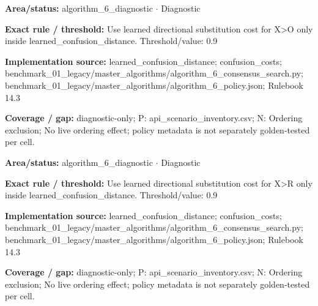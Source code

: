 \begin{tcolorbox}[enhanced,breakable,colback=white,colframe=Muted!45,boxrule=0.45pt,arc=1.5pt,left=6pt,right=6pt,top=5pt,bottom=5pt,title={\texttt{A6-LEARNED-SUBSTITUTION-X-O}},title after break={\texttt{A6-LEARNED-SUBSTITUTION-X-O}\ (continued)},fonttitle=\headingfont\bfseries\color{Navy},coltitle=Navy]
\textbf{Area/status:} algorithm\_\allowbreak{}6\_\allowbreak{}diagnostic $\boldsymbol{\cdot}$ Diagnostic\par
\smallskip
\textbf{Exact rule / threshold:} Use learned directional substitution cost for X>O only inside learned\_\allowbreak{}confusion\_\allowbreak{}distance. Threshold/\allowbreak{}value: 0.9\par
\smallskip
\textbf{Implementation source:} learned\_\allowbreak{}confusion\_\allowbreak{}distance; confusion\_\allowbreak{}costs; benchmark\_\allowbreak{}01\_\allowbreak{}legacy/\allowbreak{}master\_\allowbreak{}algorithms/\allowbreak{}algorithm\_\allowbreak{}6\_\allowbreak{}consensus\_\allowbreak{}search.py; benchmark\_\allowbreak{}01\_\allowbreak{}legacy/\allowbreak{}master\_\allowbreak{}algorithms/\allowbreak{}algorithm\_\allowbreak{}6\_\allowbreak{}policy.json; Rulebook 14.3\par
\smallskip
\textbf{Coverage / gap:} diagnostic-only; P: api\_\allowbreak{}scenario\_\allowbreak{}inventory.csv; N: Ordering exclusion; No live ordering effect; policy metadata is not separately golden-tested per cell.
\end{tcolorbox}
\begin{tcolorbox}[enhanced,breakable,colback=white,colframe=Muted!45,boxrule=0.45pt,arc=1.5pt,left=6pt,right=6pt,top=5pt,bottom=5pt,title={\texttt{A6-LEARNED-SUBSTITUTION-X-R}},title after break={\texttt{A6-LEARNED-SUBSTITUTION-X-R}\ (continued)},fonttitle=\headingfont\bfseries\color{Navy},coltitle=Navy]
\textbf{Area/status:} algorithm\_\allowbreak{}6\_\allowbreak{}diagnostic $\boldsymbol{\cdot}$ Diagnostic\par
\smallskip
\textbf{Exact rule / threshold:} Use learned directional substitution cost for X>R only inside learned\_\allowbreak{}confusion\_\allowbreak{}distance. Threshold/\allowbreak{}value: 0.9\par
\smallskip
\textbf{Implementation source:} learned\_\allowbreak{}confusion\_\allowbreak{}distance; confusion\_\allowbreak{}costs; benchmark\_\allowbreak{}01\_\allowbreak{}legacy/\allowbreak{}master\_\allowbreak{}algorithms/\allowbreak{}algorithm\_\allowbreak{}6\_\allowbreak{}consensus\_\allowbreak{}search.py; benchmark\_\allowbreak{}01\_\allowbreak{}legacy/\allowbreak{}master\_\allowbreak{}algorithms/\allowbreak{}algorithm\_\allowbreak{}6\_\allowbreak{}policy.json; Rulebook 14.3\par
\smallskip
\textbf{Coverage / gap:} diagnostic-only; P: api\_\allowbreak{}scenario\_\allowbreak{}inventory.csv; N: Ordering exclusion; No live ordering effect; policy metadata is not separately golden-tested per cell.
\end{tcolorbox}
